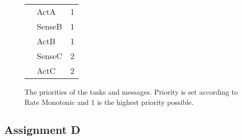 \begin{figure}[H]
\begin{minipage}{0.5\textwidth}
\begin{table}[H]
\begin{tabular}{|l|l|l|}
                                        & ActA      & 1 \\ 
                                        & SenseB    & 1 \\
                                        & ActB      & 1 \\
                                        & SenseC    & 2 \\
                                        & ActC      & 2 \\ \hline
            \end{tabular}
        \end{table}
    \end{minipage}
    \caption{The priorities of the tasks and messages. Priority is set according to Rate Monotonic and 1 is the highest priority possible.}
    \label{fig:priority}
    \end{figure}
    \renewcommand{\arraystretch}{1.0}

    \subsection{Assignment D}

